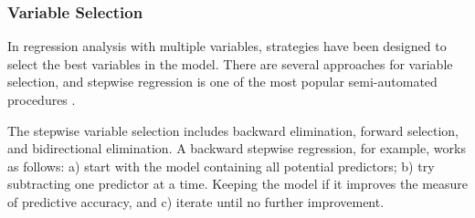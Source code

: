 \documentclass[12pt,english]{report}
\begin{document}

\subsubsection{Variable Selection}
In regression analysis with multiple variables, strategies have been designed
to select the best variables in the model. There are several approaches for
variable selection, and stepwise regression is one of the most popular
semi-automated procedures \citep{konishi2008information}.


The stepwise variable selection includes backward elimination, forward
selection, and
bidirectional elimination. A backward stepwise regression, for example, works
as follows:
a) start with the model containing all potential predictors; b) try subtracting
one predictor
at a time. Keeping the model if it improves the measure of predictive accuracy,
and c) 
iterate until no further improvement.
\end{document}
